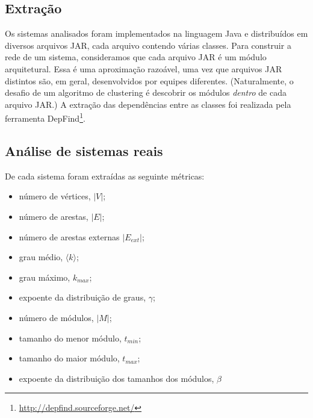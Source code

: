 \documentclass{acm_proc_article-sp}
\begin{document}
\subsection{Extração}

Os sistemas analisados foram implementados na linguagem Java e distribuídos em diversos arquivos JAR, cada arquivo contendo várias classes. Para construir a rede de um sistema, consideramos que cada arquivo JAR é um módulo arquitetural. Essa é uma aproximação razoável, uma vez que arquivos JAR distintos são, em geral, desenvolvidos por equipes diferentes. (Naturalmente, o desafio de um algoritmo de clustering é descobrir os módulos \emph{dentro} de cada arquivo JAR.) A extração das dependências entre as classes foi realizada pela ferramenta DepFind\footnote{\url{http://depfind.sourceforge.net/}}.


\subsection{Análise de sistemas reais}


De cada sistema foram extraídas as seguinte métricas:

\begin{itemize}
\item número de vértices, $|V|$;
\item número de arestas, $|E|$;
\item número de arestas externas $|E_{ext}|$;
\item grau médio, $\langle k \rangle$;
\item grau máximo, $k_{max}$;
\item expoente da distribuição de graus, $\gamma$;
\item número de módulos, $|M|$;
\item tamanho do menor módulo, $t_{min}$;
\item tamanho do maior módulo, $t_{max}$;
\item expoente da distribuição dos tamanhos dos módulos, $\beta$
\end{itemize}
\end{document}
